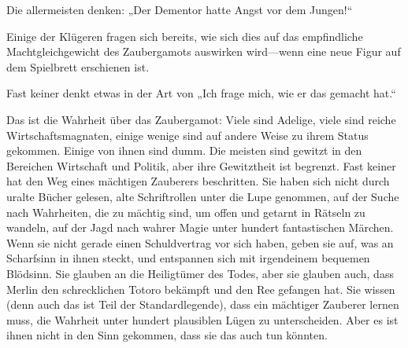 Die allermeisten denken: „Der Dementor hatte Angst vor dem Jungen!“

Einige der Klügeren fragen sich bereits, wie sich dies auf das empfindliche Machtgleichgewicht des Zaubergamots auswirken wird—wenn eine neue Figur auf dem Spielbrett erschienen ist.

Fast keiner denkt etwas in der Art von „Ich frage mich, wie er das gemacht hat.“

Das ist die Wahrheit über das Zaubergamot: Viele sind Adelige, viele sind reiche Wirtschaftsmagnaten, einige wenige sind auf andere Weise zu ihrem Status gekommen. Einige von ihnen sind dumm. Die meisten sind gewitzt in den Bereichen Wirtschaft und Politik, aber ihre Gewitztheit ist begrenzt. Fast keiner hat den Weg eines mächtigen Zauberers beschritten. Sie haben sich nicht durch uralte Bücher gelesen, alte Schriftrollen unter die Lupe genommen, auf der Suche nach Wahrheiten, die zu mächtig sind, um offen und getarnt in Rätseln zu wandeln, auf der Jagd nach wahrer Magie unter hundert fantastischen Märchen. Wenn sie nicht gerade einen Schuldvertrag vor sich haben, geben sie auf, was an Scharfsinn in ihnen steckt, und entspannen sich mit irgendeinem bequemen Blödsinn. Sie glauben an die Heiligtümer des Todes, aber sie glauben auch, dass Merlin den schrecklichen Totoro bekämpft und den Ree gefangen hat. Sie wissen (denn auch das ist Teil der Standardlegende), dass ein mächtiger Zauberer lernen muss, die Wahrheit unter hundert plausiblen Lügen zu unterscheiden. Aber es ist ihnen nicht in den Sinn gekommen, dass sie das auch tun könnten.

